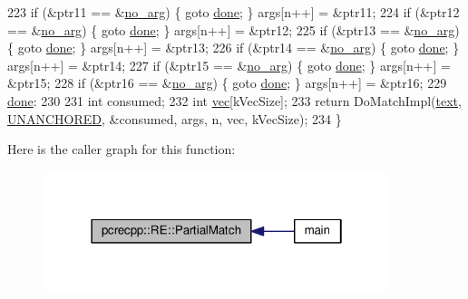 \begin{DoxyCode}
223   \textcolor{keywordflow}{if} (&ptr11 == &\hyperlink{classpcrecpp_1_1RE_a596c7c964ad0e41415540e12ee73d302}{no\_arg}) \{ \textcolor{keywordflow}{goto} \hyperlink{README_8txt_aab36b2734b1c834ca42fc771a40b98ef}{done}; \} args[n++] = &ptr11;
224   \textcolor{keywordflow}{if} (&ptr12 == &\hyperlink{classpcrecpp_1_1RE_a596c7c964ad0e41415540e12ee73d302}{no\_arg}) \{ \textcolor{keywordflow}{goto} \hyperlink{README_8txt_aab36b2734b1c834ca42fc771a40b98ef}{done}; \} args[n++] = &ptr12;
225   \textcolor{keywordflow}{if} (&ptr13 == &\hyperlink{classpcrecpp_1_1RE_a596c7c964ad0e41415540e12ee73d302}{no\_arg}) \{ \textcolor{keywordflow}{goto} \hyperlink{README_8txt_aab36b2734b1c834ca42fc771a40b98ef}{done}; \} args[n++] = &ptr13;
226   \textcolor{keywordflow}{if} (&ptr14 == &\hyperlink{classpcrecpp_1_1RE_a596c7c964ad0e41415540e12ee73d302}{no\_arg}) \{ \textcolor{keywordflow}{goto} \hyperlink{README_8txt_aab36b2734b1c834ca42fc771a40b98ef}{done}; \} args[n++] = &ptr14;
227   \textcolor{keywordflow}{if} (&ptr15 == &\hyperlink{classpcrecpp_1_1RE_a596c7c964ad0e41415540e12ee73d302}{no\_arg}) \{ \textcolor{keywordflow}{goto} \hyperlink{README_8txt_aab36b2734b1c834ca42fc771a40b98ef}{done}; \} args[n++] = &ptr15;
228   \textcolor{keywordflow}{if} (&ptr16 == &\hyperlink{classpcrecpp_1_1RE_a596c7c964ad0e41415540e12ee73d302}{no\_arg}) \{ \textcolor{keywordflow}{goto} \hyperlink{README_8txt_aab36b2734b1c834ca42fc771a40b98ef}{done}; \} args[n++] = &ptr16;
229  \hyperlink{README_8txt_aab36b2734b1c834ca42fc771a40b98ef}{done}:
230 
231   \textcolor{keywordtype}{int} consumed;
232   \textcolor{keywordtype}{int} \hyperlink{group__apr__file__io_ga026ee9293cfdb03a3944adbd192f1ead}{vec}[kVecSize];
233   \textcolor{keywordflow}{return} DoMatchImpl(\hyperlink{group__APR__Util__XML_ga6f353ddc97cf6dc93417f58016afe82c}{text}, \hyperlink{classpcrecpp_1_1RE_aafe8a162d00ec7a7d6d2ba67652735efa8511ace935198310276d68934194a16a}{UNANCHORED}, &consumed, args, n, vec, kVecSize);
234 \}
\end{DoxyCode}


Here is the caller graph for this function\+:
\nopagebreak
\begin{figure}[H]
\begin{center}
\leavevmode
\includegraphics[width=286pt]{classpcrecpp_1_1RE_af96bf86e443240bb68028d257a02fd00_icgraph}
\end{center}
\end{figure}


